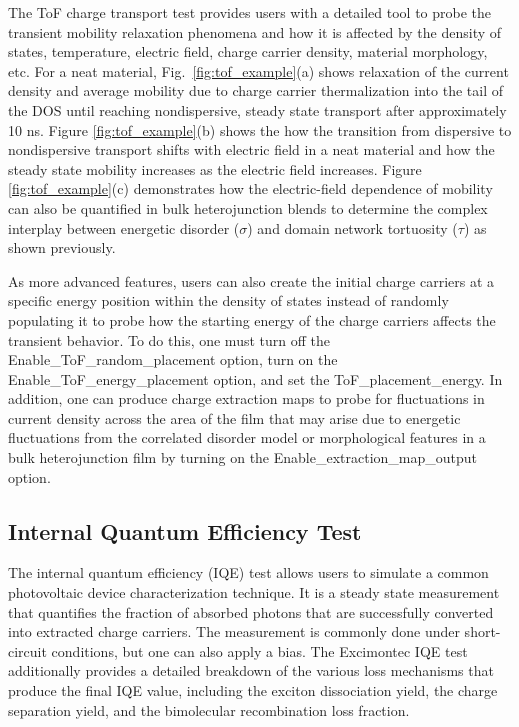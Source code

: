 \documentclass[%
 reprint,onecolumn,notitlepage,
superscriptaddress,longbibliography,
 amsmath,amssymb,
 aps,rmp,floatfix,
]{revtex4-1}
\begin{document}
The ToF charge transport test provides users with a detailed tool to probe the transient mobility relaxation phenomena and how it is affected by the density of states, temperature, electric field, charge carrier density, material morphology, etc. 
For a neat material, Fig.\ \ref{fig:tof_example}(a) shows relaxation of the current density and average mobility due to charge carrier thermalization into the tail of the DOS until reaching nondispersive, steady state transport after approximately 10 ns.
Figure \ref{fig:tof_example}(b) shows the how the transition from dispersive to nondispersive transport shifts with electric field in a neat material and how the steady state mobility increases as the electric field increases. 
Figure \ref{fig:tof_example}(c) demonstrates how the electric-field dependence of mobility can also be quantified in bulk heterojunction blends to determine the complex interplay between energetic disorder ($\sigma$) and domain network tortuosity ($\tau$) as shown previously.\cite{heiber2017prapp2}

As more advanced features, users can also create the initial charge carriers at a specific energy position within the density of states instead of randomly populating it to probe how the starting energy of the charge carriers affects the transient behavior.
To do this, one must turn off the Enable\_ToF\_random\_placement option, turn on the Enable\_ToF\_energy\_placement option, and set the ToF\_placement\_energy.
In addition, one can produce charge extraction maps to probe for fluctuations in current density across the area of the film that may arise due to energetic fluctuations from the correlated disorder model or morphological features in a bulk heterojunction film by turning on the Enable\_extraction\_map\_output option.

\subsection{Internal Quantum Efficiency Test}

The internal quantum efficiency (IQE) test allows users to simulate a common photovoltaic device characterization technique.
It is a steady state measurement that quantifies the fraction of absorbed photons that are successfully converted into extracted charge carriers. 
The measurement is commonly done under short-circuit conditions, but one can also apply a bias.
The Excimontec IQE test additionally provides a detailed breakdown of the various loss mechanisms that produce the final IQE value, including the exciton dissociation yield, the charge separation yield, and the bimolecular recombination loss fraction.
\end{document}

